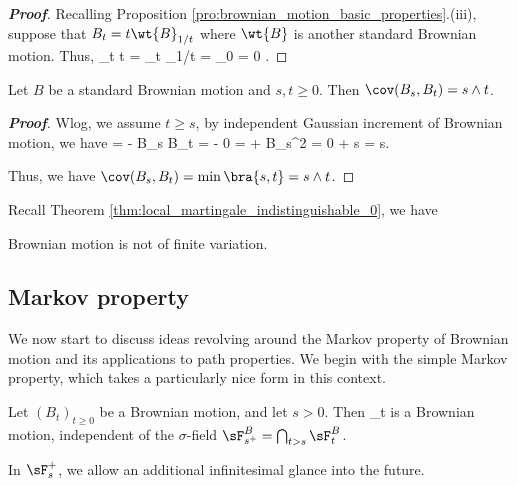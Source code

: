 \begin{proof}[\bf Proof]
Recalling Proposition \ref{pro:brownian_motion_basic_properties}.(iii), suppose that $B_t = t\wt{B}_{1/t}$ where $\wt{B}$ is another standard Brownian motion. Thus,
\be
\lim_{t\to\infty} t = \lim_{t\to \infty} _{1/t} = _0 = 0 .
\ee
\end{proof}

\begin{lemma}\label{lem:standard_brownian_motion_covariance}
Let $B$ be a standard Brownian motion and $s, t \geq 0$. Then $\cov(B_s,B_t) = s \land t$.
\end{lemma}

\begin{proof}[\bf Proof]
Wlog, we assume $t\geq s$, by independent Gaussian increment of Brownian motion, we have
\be
\cov {} = \E{} - \E B_s \E B_t = \E{} - 0 = \E{} + \E\brb B_s^2 = 0 + s = s.
\ee

Thus, we have $\cov(B_s,B_t) = \min\bra{s,t} = s \land t$.
\end{proof}

Recall Theorem \ref{thm:local_martingale_indistinguishable_0}, we have
\begin{proposition}\label{pro:brownian_motion_no_finite_variation}
Brownian motion is not of finite variation.
\end{proposition}




\subsection{Markov property}

We now start to discuss ideas revolving around the Markov property of Brownian motion and its applications to path properties. We begin with the simple Markov property, which takes a particularly nice form in this context.


\begin{theorem}\label{thm:simple_markov_property_brownian_motion}
Let $(B_t)_{t \geq 0}$ be a Brownian motion, and let $s > 0$. Then
\be
{}_{t }
\ee
is a Brownian motion, independent of the $\sigma$-field $\sF^B_{s^+} = \bigcap_{t>s} \sF^B_t$.
\end{theorem}

\begin{remark}
In $\sF_s^+$, we allow an additional infinitesimal glance into the future.
\end{remark}

